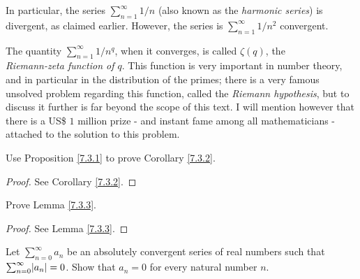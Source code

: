 \begin{note}
    In particular, the series \(\sum_{n = 1}^\infty 1 / n\) (also known as the \emph{harmonic series}) is divergent, as claimed earlier.
    However, the series is \(\sum_{n = 1}^\infty 1 / n^2\) convergent.
\end{note}

\begin{remark}\label{7.3.8}
    The quantity \(\sum_{n = 1}^\infty 1 / n^q\), when it converges, is called \(\zeta(q)\), the \\
    \emph{Riemann-zeta function of \(q\)}.
    This function is very important in number theory, and in particular in the distribution of the primes;
    there is a very famous unsolved problem regarding this function, called the \emph{Riemann hypothesis}, but to discuss it further is far beyond the scope of this text.
    I will mention however that there is a US\$ \(1\) million prize
    - and instant fame among all mathematicians -
    attached to the solution to this problem.
\end{remark}

\exercisesection

\begin{exercise}\label{ex 7.3.1}
    Use Proposition \ref{7.3.1} to prove Corollary \ref{7.3.2}.
\end{exercise}

\begin{proof}
    See Corollary \ref{7.3.2}.
\end{proof}

\begin{exercise}\label{ex 7.3.2}
    Prove Lemma \ref{7.3.3}.
\end{exercise}

\begin{proof}
    See Lemma \ref{7.3.3}.
\end{proof}

\begin{exercise}\label{ex 7.3.3}
    Let \(\sum_{n = 0}^\infty a_n\) be an absolutely convergent series of real numbers such that \(\sum_{n = 0}^\infty \abs*{a_n} = 0\).
    Show that \(a_n = 0\) for every natural number \(n\).
\end{exercise}

